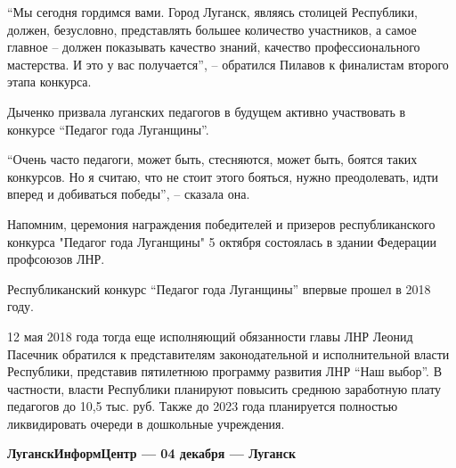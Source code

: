 \enquote{Мы сегодня гордимся вами. Город Луганск, являясь столицей Республики, должен,
безусловно, представлять большее количество участников, а самое главное –
должен показывать качество знаний, качество профессионального мастерства. И это
у вас получается}, – обратился Пилавов к финалистам второго этапа конкурса.

Дыченко призвала луганских педагогов в будущем активно участвовать в конкурсе
\enquote{Педагог года Луганщины}.

\enquote{Очень часто педагоги, может быть, стесняются, может быть, боятся таких
конкурсов. Но я считаю, что не стоит этого бояться, нужно преодолевать, идти
вперед и добиваться победы}, – сказала она.

Напомним, церемония награждения победителей и призеров республиканского
конкурса "Педагог года Луганщины" 5 октября состоялась в здании Федерации
профсоюзов ЛНР.

Республиканский конкурс \enquote{Педагог года Луганщины} впервые прошел в 2018 году.

12 мая 2018 года тогда еще исполняющий обязанности главы ЛНР Леонид Пасечник
обратился к представителям законодательной и исполнительной власти Республики,
представив пятилетнюю программу развития ЛНР \enquote{Наш выбор}. В частности, власти
Республики планируют повысить среднюю заработную плату педагогов до 10,5 тыс.
руб. Также до 2023 года планируется полностью ликвидировать очереди в
дошкольные учреждения. 

\textbf{ЛуганскИнформЦентр — 04 декабря — Луганск}

